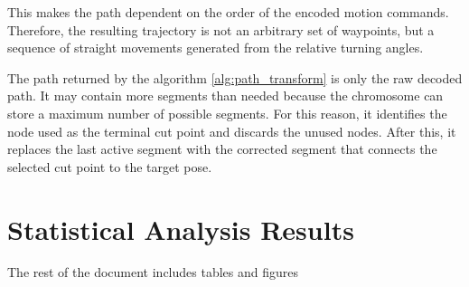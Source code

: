 \documentclass[8pt]{article}
\begin{document}
This makes the path dependent on the order of the encoded motion commands. Therefore, the resulting trajectory is not an arbitrary set of waypoints, but a sequence of straight movements generated from the relative turning angles. 

The path returned by the algorithm \ref{alg:path_transform} is only the raw decoded path. It may contain more segments than needed because the chromosome can store a maximum number of possible segments. For this reason, it identifies the node used as the terminal cut point and discards the unused nodes. After this, it replaces the last active segment with the corrected segment that connects the selected cut point to the target pose.  




\section{Statistical Analysis Results}
The rest of the document includes tables and figures
\end{document}
